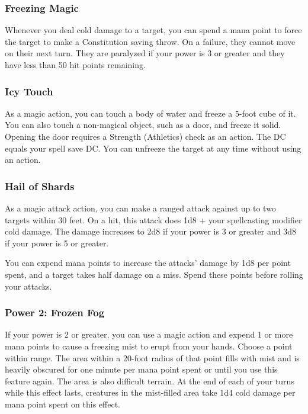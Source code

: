\documentclass[12pt,letterpaper,twocolumn,openany,nodeprecatedcode,bg=none]{dndbook}
\begin{document}
\subsubsection{Freezing Magic}\label{freezing-magic}

Whenever you deal cold damage to a target, you can spend a mana point to
force the target to make a Constitution saving throw. On a failure, they
cannot move on their next turn. They are paralyzed if your power is 3 or
greater and they have less than 50 hit points remaining.

\subsubsection{Icy Touch}\label{icy-touch}

As a magic action, you can touch a body of water and freeze a 5-foot
cube of it. You can also touch a non-magical object, such as a door, and
freeze it solid. Opening the door requires a Strength (Athletics) check
as an action. The DC equals your spell save DC. You can unfreeze the
target at any time without using an action.

\subsubsection{Hail of Shards}\label{hail-of-shards}

As a magic attack action, you can make a ranged attack against up to two
targets within 30 feet. On a hit, this attack does 1d8 + your
spellcasting modifier cold damage. The damage increases to 2d8 if your
power is 3 or greater and 3d8 if your power is 5 or greater.

You can expend mana points to increase the attacks' damage by 1d8 per
point spent, and a target takes half damage on a miss. Spend these
points before rolling your attacks.

\subsubsection{Power 2: Frozen Fog}\label{power-2-frozen-fog}

If your power is 2 or greater, you can use a magic action and expend 1
or more mana points to cause a freezing mist to erupt from your hands.
Choose a point within range. The area within a 20-foot radius of that
point fills with mist and is heavily obscured for one minute per mana
point spent or until you use this feature again. The area is also
difficult terrain. At the end of each of your turns while this effect
lasts, creatures in the mist-filled area take 1d4 cold damage per mana
point spent on this effect.
\end{document}
